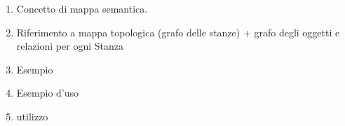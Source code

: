 \begin{enumerate}
  \item Concetto di mappa semantica.
  \item Riferimento a mappa topologica (grafo delle stanze) + grafo degli oggetti e relazioni per ogni Stanza
  \item Esempio
  \item Esempio d'uso
  \item utilizzo
\end{enumerate}